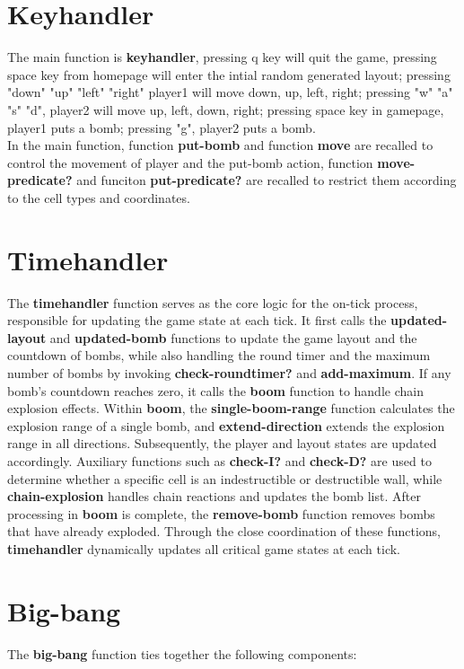 \documentclass[12pt]{article}
\begin{document}
\section{Keyhandler}
\hspace{1.27cm}
The main function is \textbf{keyhandler}, pressing q key will quit the game, pressing space key from homepage will enter the intial random generated layout; pressing "down" "up" "left" "right" player1 will move down, up, left, right; pressing "w" "a" "s" "d", player2 will move up, left, down, right; pressing space key in gamepage, player1 puts a bomb; pressing "g", player2 puts a bomb. \\
In the main function, function \textbf{put-bomb} and function \textbf{move} are recalled to control the movement of player and the put-bomb action, function \textbf{move-predicate?} and funciton \textbf{put-predicate?} are recalled to restrict them according to the cell types and coordinates.

\section{Timehandler}
\hspace{1.27cm}The \textbf{timehandler} function serves as the core logic for the on-tick process, responsible for updating the game state at each tick. It first calls the \textbf{updated-layout} and \textbf{updated-bomb} functions to update the game layout and the countdown of bombs, while also handling the round timer and the maximum number of bombs by invoking \textbf{check-roundtimer?} and \textbf{add-maximum}. If any bomb's countdown reaches zero, it calls the \textbf{boom} function to handle chain explosion effects. Within \textbf{boom}, the \textbf{single-boom-range} function calculates the explosion range of a single bomb, and \textbf{extend-direction} extends the explosion range in all directions. Subsequently, the player and layout states are updated accordingly. Auxiliary functions such as \textbf{check-I?} and \textbf{check-D?} are used to determine whether a specific cell is an indestructible or destructible wall, while \textbf{chain-explosion} handles chain reactions and updates the bomb list. After processing in \textbf{boom} is complete, the \textbf{remove-bomb} function removes bombs that have already exploded. Through the close coordination of these functions, \textbf{timehandler} dynamically updates all critical game states at each tick.

\section{Big-bang}
\hspace{1.27cm}The \textbf{big-bang} function ties together the following components:
\end{document}
